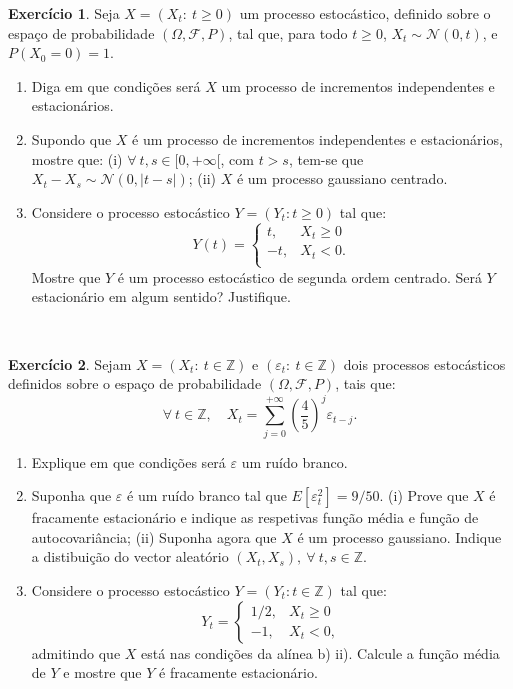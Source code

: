 \documentclass[
  11pt,
  a4paper,
]{book}
\theoremstyle{definition}
\theoremstyle{definition}
\theoremstyle{definition}
\newtheorem{exercise}{Exercício}[chapter]
\theoremstyle{definition}
\theoremstyle{remark}
\begin{document}
\begin{exercise}

Seja \(X = (X_t: ~ t \geq 0)\) um processo estocástico, definido sobre o espaço de probabilidade \((\Omega, \mathcal{F}, P)\), tal que, para todo \(t \geq 0\), \(X_t \sim \mathcal{N}(0, t)\), e \(P(X_0 = 0) = 1\).

\begin{enumerate}
\def\labelenumi{(\alph{enumi})}
\item
  Diga em que condições será \(X\) um processo de incrementos independentes e estacionários.
\item
  Supondo que \(X\) é um processo de incrementos independentes e estacionários, mostre que: (i) \(\forall~ t, s \in [0,+\infty[\), com \(t > s\), tem-se que \(X_t - X_s \sim \mathcal{N}(0, |t - s|)\); (ii) \(X\) é um processo gaussiano centrado.
\item
  Considere o processo estocástico \(Y = (Y_t: t \geq 0)\) tal que:
  \[
  Y(t)= 
  \begin{cases}
  t, & X_t \geq 0\\
  -t, & X_t < 0.\\
  \end{cases}
  \]
  Mostre que \(Y\) é um processo estocástico de segunda ordem centrado. Será \(Y\) estacionário em algum sentido? Justifique.
\end{enumerate}

\end{exercise}

\(\,\)

\begin{exercise}

Sejam \(X = (X_t: ~t \in \mathbb{Z})\) e \((\varepsilon_t: ~t \in \mathbb{Z})\) dois processos estocásticos definidos sobre o espaço de probabilidade \((\Omega, \mathcal{F}, P)\), tais que:
\[
\forall ~t \in \mathbb{Z}, \quad X_t = \sum\limits_{j=0}^{+\infty} \left( \frac{4}{5} \right)^j \varepsilon_{t-j}.
\]

\begin{enumerate}
\def\labelenumi{(\alph{enumi})}
\item
  Explique em que condições será \(\varepsilon\) um ruído branco.
\item
  Suponha que \(\varepsilon\) é um ruído branco tal que \(E[\varepsilon_t^2] = 9/50\). (i) Prove que \(X\) é fracamente estacionário e indique as respetivas função média e função de autocovariância; (ii) Suponha agora que \(X\) é um processo gaussiano. Indique a distibuição do vector aleatório \((X_t, X_s), ~ \forall ~ t, s \in \mathbb{Z}\).
\item
  Considere o processo estocástico \(Y = (Y_t: t \in \mathbb{Z})\) tal que:
  \[
  Y_t = 
  \begin{cases}
  1/2, & X_t \geq 0 \\
  -1, & X_t < 0,
  \end{cases}
  \]
  admitindo que \(X\) está nas condições da alínea b) ii). Calcule a função média de \(Y\) e mostre que \(Y\) é fracamente estacionário.
\end{enumerate}

\end{exercise}
\end{document}
